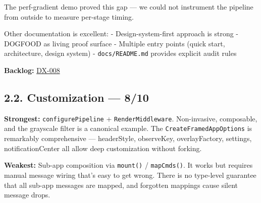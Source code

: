 

The perf-gradient demo proved this gap --- we could not instrument the pipeline from outside to measure per-stage timing.

Other documentation is excellent: - Design-system-first approach is strong - DOGFOOD as living proof surface - Multiple entry points (quick start, architecture, design system) - \texttt{d\allowbreak{}o\allowbreak{}c\allowbreak{}s\allowbreak{}/\allowbreak{}R\allowbreak{}E\allowbreak{}A\allowbreak{}D\allowbreak{}M\allowbreak{}E\allowbreak{}.\allowbreak{}m\allowbreak{}d} provides explicit audit rules

\textbf{Backlog:} \href{https://github.com/flyingrobots/bijou/blob/cbd70612140e7a450d764b3c7be1c6af878b99bc/docs/method/graveyard/legacy-backlog/inbox/DX-008-render-pipeline-guide.md}{DX-008}

\subsection{2.2. Customization --- 8/10}\label{record-411-customization-810}

\textbf{Strongest:} \texttt{c\allowbreak{}o\allowbreak{}n\allowbreak{}f\allowbreak{}i\allowbreak{}g\allowbreak{}u\allowbreak{}r\allowbreak{}e\allowbreak{}P\allowbreak{}i\allowbreak{}p\allowbreak{}e\allowbreak{}l\allowbreak{}i\allowbreak{}n\allowbreak{}e} + \texttt{R\allowbreak{}e\allowbreak{}n\allowbreak{}d\allowbreak{}e\allowbreak{}r\allowbreak{}M\allowbreak{}i\allowbreak{}d\allowbreak{}d\allowbreak{}l\allowbreak{}e\allowbreak{}w\allowbreak{}a\allowbreak{}r\allowbreak{}e}. Non-invasive, composable, and the grayscale filter is a canonical example. The \texttt{C\allowbreak{}r\allowbreak{}e\allowbreak{}a\allowbreak{}t\allowbreak{}e\allowbreak{}F\allowbreak{}r\allowbreak{}a\allowbreak{}m\allowbreak{}e\allowbreak{}d\allowbreak{}A\allowbreak{}p\allowbreak{}p\allowbreak{}O\allowbreak{}p\allowbreak{}t\allowbreak{}i\allowbreak{}o\allowbreak{}n\allowbreak{}s} is remarkably comprehensive --- headerStyle, observeKey, overlayFactory, settings, notificationCenter all allow deep customization without forking.

\textbf{Weakest:} Sub-app composition via \texttt{m\allowbreak{}o\allowbreak{}u\allowbreak{}n\allowbreak{}t\allowbreak{}(\allowbreak{})} / \texttt{m\allowbreak{}a\allowbreak{}p\allowbreak{}C\allowbreak{}m\allowbreak{}d\allowbreak{}s\allowbreak{}(\allowbreak{})}. It works but requires manual message wiring that's easy to get wrong. There is no type-level guarantee that all sub-app messages are mapped, and forgotten mappings cause silent message drops.

